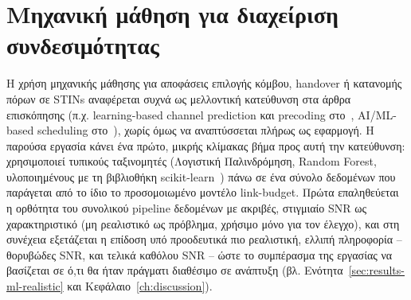 \section{Μηχανική μάθηση για διαχείριση συνδεσιμότητας}
\label{sec:bg-ml}

Η χρήση μηχανικής μάθησης για αποφάσεις επιλογής κόμβου, handover ή
κατανομής πόρων σε STINs αναφέρεται συχνά ως μελλοντική κατεύθυνση στα
άρθρα επισκόπησης (π.χ. learning-based channel prediction και precoding
στο~\cite{li2025advancing}, AI/ML-based scheduling
στο~\cite{majamaa2024toward}), χωρίς όμως να αναπτύσσεται πλήρως ως
εφαρμογή. Η παρούσα εργασία κάνει ένα πρώτο, μικρής κλίμακας βήμα προς
αυτή την κατεύθυνση: χρησιμοποιεί τυπικούς ταξινομητές (Λογιστική
Παλινδρόμηση, Random Forest, υλοποιημένους με τη βιβλιοθήκη
scikit-learn~\cite{pedregosa2011sklearn}) πάνω σε ένα σύνολο δεδομένων
που παράγεται από το ίδιο το προσομοιωμένο μοντέλο link-budget. Πρώτα
επαληθεύεται η ορθότητα του συνολικού pipeline δεδομένων με ακριβές,
στιγμιαίο SNR ως χαρακτηριστικό (μη ρεαλιστικό ως πρόβλημα, χρήσιμο μόνο
για τον έλεγχο), και στη συνέχεια εξετάζεται η επίδοση υπό προοδευτικά
πιο ρεαλιστική, ελλιπή πληροφορία -- θορυβώδες SNR, και τελικά καθόλου
SNR -- ώστε το συμπέρασμα της εργασίας να βασίζεται σε ό,τι θα ήταν
πράγματι διαθέσιμο σε ανάπτυξη (βλ. Ενότητα~\ref{sec:results-ml-realistic}
και Κεφάλαιο~\ref{ch:discussion}).

